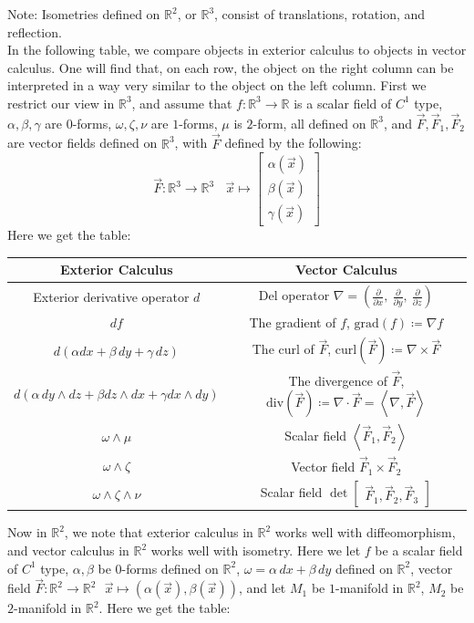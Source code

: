 \documentclass[11pt,oneside]{book}
\theoremstyle{break}
\theoremstyle{break}
\newcommand{\R}{\mathbb{R}}
\newcommand{\bmat}[1]{\begin{bmatrix} #1 \end{bmatrix}}
\newcommand{\note}{\color{red}Note: \color{black}}
\begin{document}
\note Isometries defined on $\R^2$, or $\R^3$, consist of translations, rotation, and reflection. \\

In the following table, we compare objects in exterior calculus to objects in vector calculus. One will find that, on each row, the object on the right column can be interpreted in a way very similar to the object on the left column. First we restrict our view in $\R^3$, and assume that $f:\R^3 \to \R$ is a scalar field of $C^1$ type, $\alpha,\beta,\gamma$ are $0$-forms, $\omega,\zeta,\nu$ are $1$-forms, $\mu$ is $2$-form, all defined on $\R^3$, and $\vec{F}, \vec{F}_1,\vec{F}_2$ are vector fields defined on $\R^3$, with $\vec{F}$ defined by the following:
$$\vec{F}: \R^3 \to \R^3 \ \ \ \ \vec{x}\mapsto \bmat{\alpha(\vec{x})\\ \beta(\vec{x}) \\ \gamma(\vec{x})}$$
Here we get the table:
\begin{center}
\begin{tabular}{|c|c|}
\hline
\cellcolor{orange!29} Exterior Calculus & \cellcolor{blue!29} Vector Calculus \\
\hline
Exterior derivative operator $d$ & Del operator $\nabla = \left(\frac{\partial}{\partial x}, \ \frac{\partial }{\partial y},\ \frac{\partial}{\partial z} \right)$\\
\hline
$df$ & The gradient of $f$, $\text{grad}(f) \coloneqq \nabla f$ \\
\hline
$d(\alpha dx + \beta\, dy + \gamma\, dz)$ & The curl of $\vec{F}$, $\text{curl}(\vec{F}) \coloneqq \nabla \times \vec{F}$\\
\hline
$d\left(\alpha\, dy\wedge dz + \beta dz\wedge dx + \gamma dx\wedge dy\right)$ & The divergence of $\vec{F}$, $\text{div}(\vec{F}) \coloneqq \nabla \cdot \vec{F} = \left< \nabla , \vec{F}\right>$\\
\hline
$\omega \wedge \mu$& Scalar field $\left<\vec{F}_1, \vec{F}_2\right>$\\
\hline
$\omega \wedge \zeta$& Vector field $\vec{F}_1 \times \vec{F}_2$ \\
\hline
$\omega \wedge \zeta \wedge \nu$& Scalar field $\det\bmat{\vec{F}_1,\vec{F}_2,\vec{F}_3}$\\
\hline
\end{tabular}
\end{center}
\newpage

Now in $\R^2$, we note that exterior calculus in $\R^2$ works well with diffeomorphism, and vector calculus in $\R^2$ works well with isometry. Here we let $f$ be a scalar field of $C^1$ type, $\alpha,\beta$ be $0$-forms defined on $\R^2$, $\omega = \alpha\, dx + \beta\, dy$ defined on $\R^2$, vector field $\vec{F}:\R^2 \to \R^2 \ \ \ \vec{x}\mapsto (\alpha(\vec{x}), \beta(\vec{x}))$, and let $M_1$ be $1$-manifold in $\R^2$, $M_2$ be $2$-manifold in $\R^2$. Here we get the table:
\end{document}
